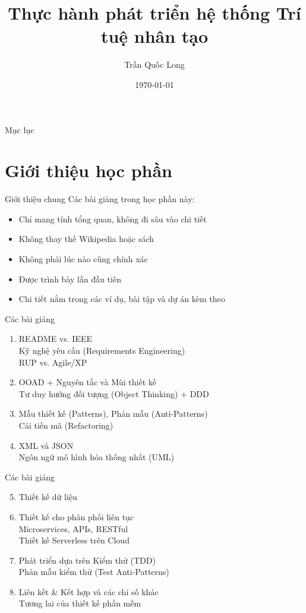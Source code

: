 \documentclass{beamer}
\title{Thực hành phát triển hệ thống Trí tuệ nhân tạo}
\author{Trần Quốc Long}
\institute{Trường ĐH Công nghệ, ĐHQG Hà Nội}
\date{\today}
\begin{document}
\begin{frame}
    \titlepage
\end{frame}

\begin{frame}{Mục lục}
    \tableofcontents
\end{frame}

\section{Giới thiệu học phần}

\begin{frame}{Giới thiệu chung}
    Các bài giảng trong học phần này:
    \begin{itemize}
        \item Chỉ mang tính tổng quan, không đi sâu vào chi tiết
        \item Không thay thế Wikipedia hoặc sách
        \item Không phải lúc nào cũng chính xác
        \item Được trình bày lần đầu tiên
        \item Chi tiết nằm trong các ví dụ, bài tập và dự án kèm theo
    \end{itemize}
\end{frame}

\begin{frame}{Các bài giảng}
    \begin{enumerate}
        \item README vs. IEEE
        \\ Kỹ nghệ yêu cầu (Requirements Engineering)
        \\ RUP vs. Agile/XP
        \item OOAD + Nguyên tắc và Mùi thiết kế
        \\ Tư duy hướng đối tượng (Object Thinking) + DDD
        \item Mẫu thiết kế (Patterns), Phản mẫu (Anti-Patterns)\\Cải tiến mã (Refactoring)
        \item XML và JSON
        \\ Ngôn ngữ mô hình hóa thống nhất (UML)
    \end{enumerate}        
\end{frame}


\begin{frame}{Các bài giảng}
    \begin{enumerate}
        \setcounter{enumi}{4}
        \item Thiết kế dữ liệu
        \item Thiết kế cho phân phối liên tục
        \\Microservices, APIs, RESTful
        \\Thiết kế Serverless trên Cloud
        \item Phát triển dựa trên Kiểm thử (TDD)
        \\Phản mẫu kiểm thử (Test Anti-Patterns)
        \item Liên kết \& Kết hợp và các chỉ số khác
        \\Tương lai của thiết kế phần mềm
    \end{enumerate}        
\end{frame}
\end{document}
